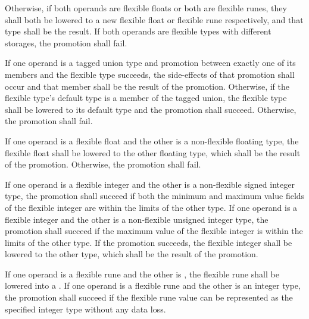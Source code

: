 \specsubitem
Otherwise, if both operands are flexible floats or both are flexible runes,
they shall both be lowered to a new flexible float or flexible rune
respectively, and that type shall be the result. If both operands are flexible
types with different storages, the promotion shall fail.

\specsubitem
If one operand is a tagged union type and promotion between exactly one of its
members and the flexible type succeeds, the side-effects of that promotion shall
occur and that member shall be the result of the promotion. Otherwise, if the
flexible type's default type is a member of the tagged union, the flexible type
shall be lowered to its default type and the promotion shall succeed. Otherwise,
the promotion shall fail.

\specsubitem
If one operand is a flexible float and the other is a non-flexible floating
type, the flexible float shall be lowered to the other floating type, which
shall be the result of the promotion. Otherwise, the promotion shall fail.


\specsubitem
If one operand is a flexible integer and the other is a non-flexible signed
integer type, the promotion shall succeed if both the minimum and maximum value
fields of the flexible integer are within the limits of the other type. If one
operand is a flexible integer and the other is a non-flexible unsigned integer
type, the promotion shall succeed if the maximum value of the flexible integer
is within the limits of the other type. If the promotion succeeds, the flexible
integer shall be lowered to the other type, which shall be the result of the
promotion.

\specsubitem
If one operand is a flexible rune and the other is , the flexible
rune shall be lowered into a . If one operand is a flexible rune
and the other is an integer type, the promotion shall succeed if the flexible
rune value can be represented as the specified integer type without any data
loss.

